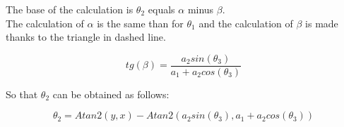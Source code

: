\noindent The base of the calculation is $\theta_2$ equals $\alpha$ minus $\beta$.\\
The calculation of $\alpha$ is the same than for $\theta_1$ and the calculation of $\beta$ is made thanks to the triangle in dashed line.

\begin{center}
	\begin{equation}
		tg(\beta) = \frac{a_2sin(\theta_3)}{a_1+a_2 cos(\theta_3)}
	\end{equation}
\end{center}

\noindent So that $\theta_2$ can be obtained as follows:

\begin{center}
	\begin{equation}
		\theta_2 = Atan2(y,x) - Atan2(a_2sin(\theta_3),a_1+a_2 cos(\theta_3))
	\end{equation}
\end{center}